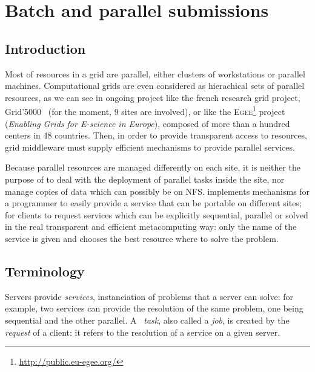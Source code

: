 
\chapter{Batch and parallel submissions}\label{chapter:parallelSubmission}
\section{Introduction}

Most of resources in a grid are parallel, either clusters of
workstations or parallel machines. Computational grids are even
considered as hierachical sets of parallel resources, as we can see in
ongoing project like the french research grid project,
Grid'5000~\cite{grid5000} (for the moment, 9 sites are involved), or
like the \textsc{Egee}\footnote{\url{http://public.eu-egee.org/}}
project ({\it Enabling Grids for E-science in Europe}), composed of
more than a hundred centers in 48 countries. Then, in order to provide
transparent access to resources, grid middleware must supply efficient
mechanisms to provide parallel services.

Because parallel resources are managed differently on each site, it is
neither the purpose of \diet to deal with the deployment of parallel
tasks inside the site, nor manage copies of data which can possibly be
on NFS. \diet implements mechanisms for a \sed programmer to easily
provide a service that can be portable on different sites; for clients
to request services which can be explicitly sequential, parallel or
solved in the real transparent and efficient metacomputing way: only
the name of the service is given and \diet chooses the best resource
where to solve the problem.

\section{Terminology}


Servers provide {\it services}, \eg instanciation of {problems} that a
server can solve: for example, two services can provide the resolution
of the same problem, one being sequential and the other parallel. A
\diet~{\it task}, also called a {\it job}, is created by the {\it
request} of a client: it refers to the resolution of a service on a
given server.


